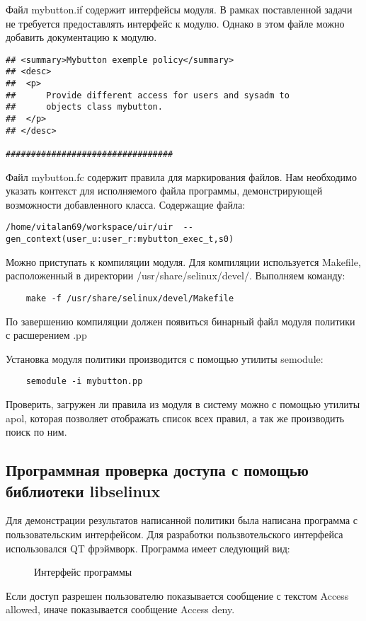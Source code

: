 \documentclass{./../class/UIR}
\begin{document}
	Файл mybutton.if содержит интерфейсы модуля. В рамках поставленной задачи не
	требуется предоставлять интерфейс к модулю. Однако в этом файле можно добавить
	документацию к модулю.
	\begin{verbatim}
## <summary>Mybutton exemple policy</summary>
## <desc>
##	<p>
##		Provide different access for users and sysadm to 
##      objects class mybutton.
##	</p>
## </desc>

#################################
	\end{verbatim}
	
	Файл mybutton.fc содержит правила для маркирования файлов. Нам необходимо
	указать контекст для исполняемого файла программы, демонстрирующей возможности
	добавленного класса. Содержащие файла:
	\begin{verbatim}
/home/vitalan69/workspace/uir/uir  -- gen_context(user_u:user_r:mybutton_exec_t,s0)
	\end{verbatim}
	
	Можно приступать к компиляции модуля. Для компиляции используется Makefile,
	расположенный в директории /usr/share/selinux/devel/. Выполняем команду:
	\begin{verbatim}
	make -f /usr/share/selinux/devel/Makefile
	\end{verbatim}
	По завершению компиляции должен появиться бинарный файл модуля политики с
	расшерением .pp
	
	Установка модуля политики производится с помощью утилиты semodule:
	\begin{verbatim}
	semodule -i mybutton.pp
	\end{verbatim}
	
	Проверить, загружен ли правила из модуля в систему можно с помощью утилиты
	apol, которая позволяет отображать список всех правил, а так же производить
	поиск по ним. 
	
	 \subsection{Программная проверка доступа с помощью библиотеки
	libselinux}
	Для демонстрации результатов написанной политики была написана программа с
	пользовательским интерфейсом. Для разработки пользвотельского интерфейса
	использовался QT фрэймворк. Программа имеет следующий вид:
	 \begin{figure}
     \caption{Интерфейс программы}
     \end{figure}
     Если доступ разрешен пользователю показывается сообщение с текстом
     Access allowed, иначе показывается сообщение Access deny.
     
\end{document}
